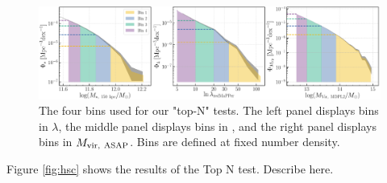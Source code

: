 \documentclass[a4paper,fleqn,usenatbib]{mnras}
\begin{document}
  \begin{figure}
      \centering 
      \includegraphics[width=\textwidth]{fig/small/density_bins_sum}
      \caption{The four bins used for our "top-N" tests. The left panel displays bins in $\lambda$, the middle panel displays bins in \mmax{}, and the right panel displays bins in 
          $M_{\rm vir,\ ASAP}$. Bins are defined at fixed number density. }
      \label{fig:density_bins}
  \end{figure}

Figure \ref{fig:hsc} shows the results of the Top N test. Describe here.
\end{document}
